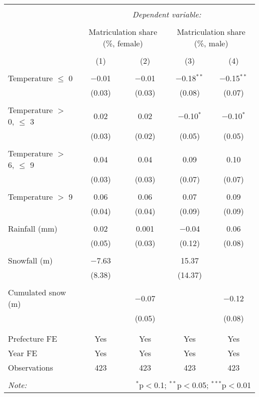 
\begin{tabular}{@{\extracolsep{5pt}}lcccc} 
\\[-1.8ex]\hline 
\hline \\[-1.8ex] 
 & \multicolumn{4}{c}{\textit{Dependent variable:}} \\ 
\cline{2-5} 
\\[-1.8ex] & \multicolumn{2}{c}{Matriculation share (\%, female)} & \multicolumn{2}{c}{Matriculation share (\%, male)} \\ 
\\[-1.8ex] & (1) & (2) & (3) & (4)\\ 
\hline \\[-1.8ex] 
 Temperature $\le$ 0 & $-$0.01 & $-$0.01 & $-$0.18$^{**}$ & $-$0.15$^{**}$ \\ 
  & (0.03) & (0.03) & (0.08) & (0.07) \\ 
  & & & & \\ 
 Temperature $>$ 0, $\le$ 3 & 0.02 & 0.02 & $-$0.10$^{*}$ & $-$0.10$^{*}$ \\ 
  & (0.03) & (0.02) & (0.05) & (0.05) \\ 
  & & & & \\ 
 Temperature $>$ 6, $\le$ 9 & 0.04 & 0.04 & 0.09 & 0.10 \\ 
  & (0.03) & (0.03) & (0.07) & (0.07) \\ 
  & & & & \\ 
 Temperature $>$ 9 & 0.06 & 0.06 & 0.07 & 0.09 \\ 
  & (0.04) & (0.04) & (0.09) & (0.09) \\ 
  & & & & \\ 
 Rainfall (mm) & 0.02 & 0.001 & $-$0.04 & 0.06 \\ 
  & (0.05) & (0.03) & (0.12) & (0.08) \\ 
  & & & & \\ 
 Snowfall (m) & $-$7.63 &  & 15.37 &  \\ 
  & (8.38) &  & (14.37) &  \\ 
  & & & & \\ 
 Cumulated snow (m) &  & $-$0.07 &  & $-$0.12 \\ 
  &  & (0.05) &  & (0.08) \\ 
  & & & & \\ 
\hline \\[-1.8ex] 
Prefecture FE & Yes & Yes & Yes & Yes \\ 
Year FE & Yes & Yes & Yes & Yes \\ 
Observations & 423 & 423 & 423 & 423 \\ 
\hline 
\hline \\[-1.8ex] 
\textit{Note:}  & \multicolumn{4}{r}{$^{*}$p$<$0.1; $^{**}$p$<$0.05; $^{***}$p$<$0.01} \\ 
\end{tabular} 
